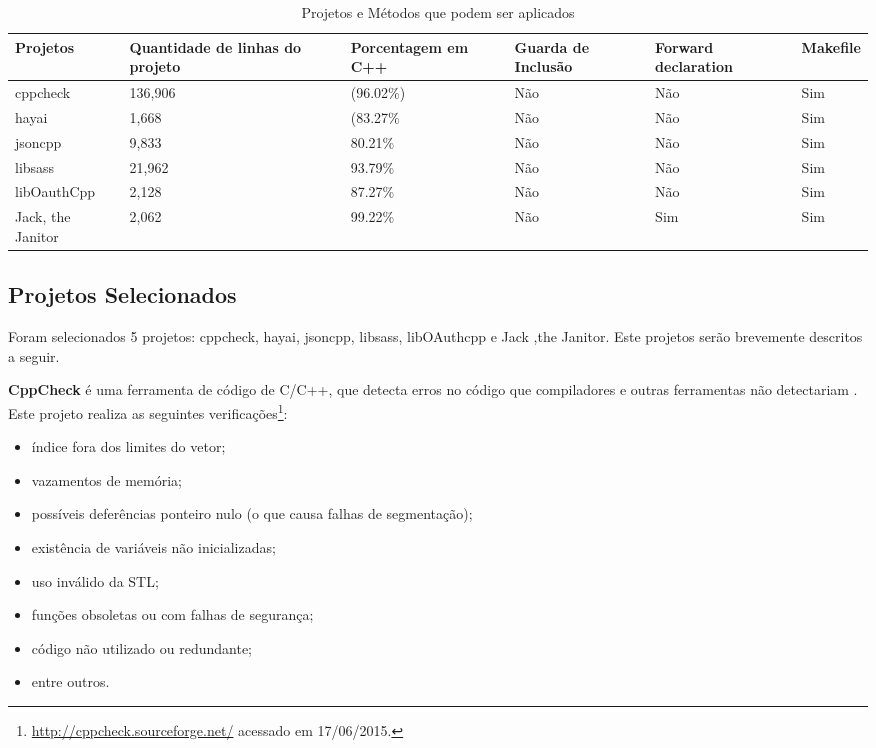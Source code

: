 \begin{table}[!ht]
\centering
\caption{Projetos e Métodos que podem ser aplicados}
\label{tab:projects}
\begin{tiny}
\begin{tabular}{lp{2cm}p{2cm}p{2cm}p{2cm}p{2cm}}
	\toprule
	\textbf{Projetos} & \textbf{Quantidade de linhas do projeto} & \textbf{Porcentagem em C++} &
	\textbf{Guarda de Inclusão} & \textbf{Forward declaration} & \textbf{Makefile} \\
	\midrule
	cppcheck & 136,906 & (96.02\%) & Não & Não & Sim \\
	hayai & 1,668 & (83.27\% & Não & Não & Sim \\
	jsoncpp & 9,833 & 80.21\% & Não & Não & Sim \\
	libsass & 21,962 & 93.79\% & Não & Não & Sim \\
	libOauthCpp & 2,128 & 87.27\% & Não & Não & Sim \\
	Jack, the Janitor & 2,062 & 99.22\% & Não & Sim & Sim \\
	\bottomrule
\end{tabular}
\end{tiny}
\end{table}

\subsection{Projetos Selecionados}

Foram selecionados 5 projetos: cppcheck, hayai, jsoncpp, libsass,
 libOAuthcpp e Jack ,the Janitor. Este projetos serão brevemente 
descritos a seguir.

\textbf{CppCheck} é uma ferramenta de código de C/C++, que detecta erros no código
 que compiladores e outras ferramentas não detectariam . Este projeto realiza
 as seguintes verificações\footnote{\url{http://cppcheck.sourceforge.net/}
 acessado em 17/06/2015.}:

\begin{itemize}
	\item índice fora dos limites do vetor;    
    \item vazamentos de memória;
    \item possíveis deferências ponteiro nulo (o que causa falhas de segmentação);
	\item existência de variáveis não inicializadas;
	\item uso inválido da STL;
	\item funções obsoletas ou com falhas de segurança; 
	\item código não utilizado ou redundante;
	\item entre outros.
\end{itemize}


